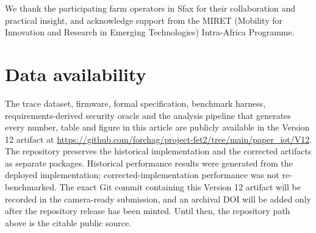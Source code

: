\documentclass[a4paper,fleqn]{cas-sc}
\begin{document}
We thank the participating farm operators in Sfax for their collaboration and
practical insight, and acknowledge support from the MIRET (Mobility for
Innovation and Research in Emerging Technologies) Intra-Africa Programme.

\section*{Data availability}

The trace dataset, firmware, formal specification, benchmark harness,
requirements-derived security oracle and the analysis pipeline that
generates every number, table and figure in this article are publicly
available in the Version 12 artifact at
\url{https://github.com/forchag/project-fet2/tree/main/paper_iot/V12}.
The repository preserves the historical implementation and the corrected
artifacts as separate packages. Historical performance results were
generated from the deployed implementation; corrected-implementation
performance was not re-benchmarked. The exact Git commit containing this
Version 12 artifact will be recorded in the camera-ready submission, and
an archival DOI will be added only after the repository release has been
minted. Until then, the repository path above is the citable public source.

\clearpage


\end{document}
